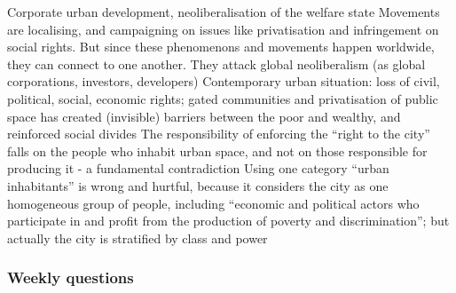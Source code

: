 \documentclass{article}
\begin{document}
\begin{outline}
		\2 Corporate urban development, neoliberalisation of the welfare state
		\2 Movements are localising, and campaigning on issues like privatisation and infringement on social rights. But since these phenomenons and movements happen worldwide, they can connect to one another. They attack global neoliberalism (as global corporations, investors, developers)
	\1 Contemporary urban situation: loss of civil, political, social, economic rights; gated communities and privatisation of public space has created (invisible) barriers between the poor and wealthy, and reinforced social divides
	\1 The responsibility of enforcing the ``right to the city'' falls on the people who inhabit urban space, and not on those responsible for producing it - a fundamental contradiction 
		\2 Using one category ``urban inhabitants'' is wrong and hurtful, because it considers the city as one homogeneous group of people, including ``economic and political actors who participate in and profit from the production of poverty and discrimination''; but actually the city is stratified by class and power
\end{outline}

\subsubsection{Weekly questions}
\end{document}
